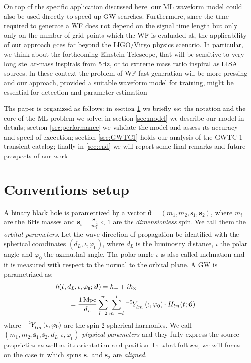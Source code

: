 On top of the specific application discussed here, our ML waveform model could also be used directly 
to speed up GW searches. Furthermore, since the time required to generate a WF does not depend
on the signal time length but only only on the number of grid points which the WF is evaluated at,
the applicability of our approach goes far beyond the LIGO/Virgo physics scenario. In particular,
we think about the forthcoming Einstein Telescope, that will be sensitive to very long stellar-mass 
inspirals from 5Hz, or to extreme mass ratio inspiral as LISA sources. In these context the problem
of WF fast generation will be more pressing and our approach, provided a suitable waveform model 
for training,  might be essential for detection and parameter estimation. 

The paper is organized as follows:
in section \ref{sec:setup} we briefly set the notation and the core of the ML problem we solve; in section \ref{sec:model} we describe our model in details; section \ref{sec:performance} we validate the model and assess its accuracy and speed of execution; section \ref{sec:GWTC1} holds our analysis of the GWTC-1 transient catalog; finally in \ref{sec:end} we will report some final remarks and future prospects of our work.

\section{Conventions setup}
\label{sec:setup}
A binary black hole is parametrized by a vector $ \boldsymbol{\vartheta} = (m_1,m_2, \mathbf{s}_1,\mathbf{s}_2) $, where $m_i$ are the BHs masses and $\mathbf{s}_i = \frac{\mathbf{S}_i}{m_i^2} <1$ are the \textit{dimensionless} spin. 
We call them the \textit{orbital parameters}.
Let the wave direction of propagation be identified with the spherical coordinates $(d_L, \iota, \varphi_0)$, where $d_L$ is the luminosity distance, $\iota$ the polar angle and $\varphi_0$ the azimuthal angle. The polar angle $\iota$ is also called inclination and it is measured with respect to the normal to the orbital plane.
A GW is parametrized as:
\begin{align} \label{eq:h_parametrization}
	&h(t, d_L,\iota,\varphi_0; \boldsymbol{\vartheta}) = h_+ + i h_\times \nonumber \\
		&\qquad= {\frac{\SI{1}{Mpc}}{d_L}} \sum_{l = 2}^{\infty} \sum_{m = -l}^{l} \tensor[^{-2}]{Y}{_{l m}}(\iota, \varphi_0) \cdot H_{lm}(t; \boldsymbol{\vartheta})
\end{align}
where $\tensor[^{-2}]{Y}{_{l m}}(\iota, \varphi_0)$ are the spin-2 spherical harmonics.
We call $(m_1,m_2, \mathbf{s}_1,\mathbf{s}_2, d_L,\iota,\varphi_0)$ \textit{physical parameters} and they fully express the source 
proprieties as well as its orientation and position. In what follows, we will focus on the case in which 
spins $\mathbf{s}_1$ and $\mathbf{s}_2$ are \textit{aligned}. 

